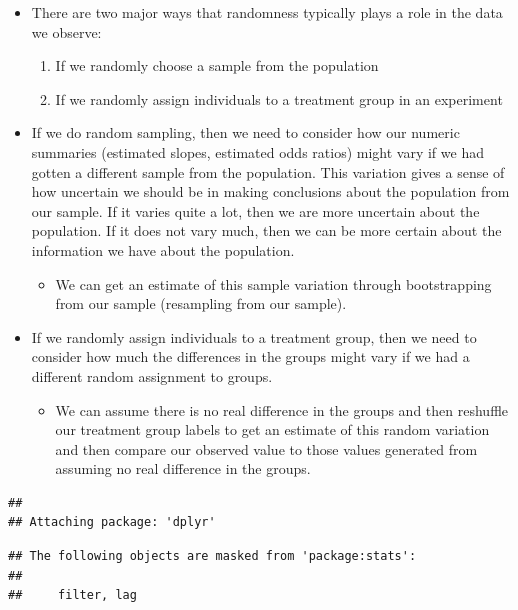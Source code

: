 \documentclass[
]{book}
\providecommand{\tightlist}{%
  \setlength{\itemsep}{0pt}\setlength{\parskip}{0pt}}
\begin{document}
\begin{itemize}
\item
  There are two major ways that randomness typically plays a role in the data we observe:

  \begin{enumerate}
  \def\labelenumi{\arabic{enumi}.}
  \tightlist
  \item
    If we randomly choose a sample from the population
  \item
    If we randomly assign individuals to a treatment group in an experiment
  \end{enumerate}
\item
  If we do random sampling, then we need to consider how our numeric summaries (estimated slopes, estimated odds ratios) might vary if we had gotten a different sample from the population. This variation gives a sense of how uncertain we should be in making conclusions about the population from our sample. If it varies quite a lot, then we are more uncertain about the population. If it does not vary much, then we can be more certain about the information we have about the population.

  \begin{itemize}
  \tightlist
  \item
    We can get an estimate of this sample variation through bootstrapping from our sample (resampling from our sample).
  \end{itemize}
\item
  If we randomly assign individuals to a treatment group, then we need to consider how much the differences in the groups might vary if we had a different random assignment to groups.

  \begin{itemize}
  \tightlist
  \item
    We can assume there is no real difference in the groups and then reshuffle our treatment group labels to get an estimate of this random variation and then compare our observed value to those values generated from assuming no real difference in the groups.
  \end{itemize}
\end{itemize}

\begin{verbatim}
## 
## Attaching package: 'dplyr'
\end{verbatim}

\begin{verbatim}
## The following objects are masked from 'package:stats':
## 
##     filter, lag
\end{verbatim}
\end{document}
